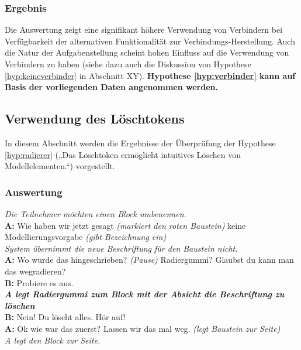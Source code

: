 \subsubsection{Ergebnis} %

Die Auswertung zeigt eine signifikant höhere Verwendung von Verbindern bei Verfügbarkeit der alternativen Funktionalität zur Verbindungs-Herstellung. Auch die Natur der Aufgabenstellung scheint hohen Einfluss auf die Verwendung von Verbindern zu haben (siehe dazu auch die Diskussion von Hypothese \ref{hyp:keineverbinder} in Abschnitt XY). \textbf{Hypothese \ref{hyp:verbinder} kann auf Basis der vorliegenden Daten angenommen werden.}


\subsection{Verwendung des Löschtokens} %
\label{sub:verwendung_des_löschtokens}

In diesem Abschnitt werden die Ergebnisse der Überprüfung der Hypothese \ref{hyp:radierer} („Das Löschtoken ermöglicht intuitives Löschen von Modellelementen.“) vorgestellt.

\subsubsection{Auswertung} %

\begin{transkript}
	\emph{Die Teilnehmer möchten einen Block umbenennen.}\\
	\textbf{A:} Wie haben wir jetzt gesagt \emph{(markiert den roten Baustein)} keine Modellierungsvorgabe \emph{(gibt Bezeichnung ein)}\\
	\emph{System übernimmt die neue Beschriftung für den Baustein nicht.}\\
	\textbf{A:} Wo wurde das hingeschrieben? \emph{(Pause)} Radiergummi? Glaubst du kann man das wegradieren?\\
	\textbf{B:} Probiere es aus.\\
	\textbf{\emph{A legt Radiergummi zum Block mit der Absicht die Beschriftung zu löschen}}\\
	\textbf{B:} Nein! Du löscht alles. Hör auf! \\
	\textbf{A:} Ok wie war das zuerst? Lassen wir das mal weg. \emph{(legt Baustein zur Seite)}\\
	\emph{A legt den Block zur Seite.} 
\end{transkript}


